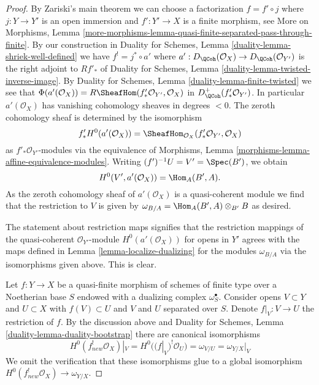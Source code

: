 \begin{proof}
By Zariski's main theorem we can choose a factorization $f = f' \circ j$
where $j : Y \to Y'$ is an open immersion and $f' : Y' \to X$ is a finite
morphism, see More on Morphisms, Lemma
\ref{more-morphisms-lemma-quasi-finite-separated-pass-through-finite}.
By our construction in
Duality for Schemes, Lemma \ref{duality-lemma-shriek-well-defined} we have
$f^! = j^* \circ a'$ where
$a' : D_\QCoh(\mathcal{O}_X) \to D_\QCoh(\mathcal{O}_{Y'})$
is the right adjoint to $Rf'_*$ of
Duality for Schemes, Lemma \ref{duality-lemma-twisted-inverse-image}.
By Duality for Schemes, Lemma \ref{duality-lemma-finite-twisted}
we see that
$\Phi(a'(\mathcal{O}_X)) = R\SheafHom(f'_*\mathcal{O}_{Y'}, \mathcal{O}_X)$ in
$D_\QCoh^+(f'_*\mathcal{O}_{Y'})$. In particular $a'(\mathcal{O}_X)$ has
vanishing cohomology sheaves in degrees $< 0$. The zeroth cohomology sheaf
is determined by the isomorphism
$$
f'_*H^0(a'(\mathcal{O}_X)) =
\SheafHom_{\mathcal{O}_X}(f'_*\mathcal{O}_{Y'}, \mathcal{O}_X)
$$
as $f'_*\mathcal{O}_{Y'}$-modules via the equivalence of
Morphisms, Lemma \ref{morphisms-lemma-affine-equivalence-modules}.
Writing $(f')^{-1}U = V' = \Spec(B')$, we obtain
$$
H^0(V', a'(\mathcal{O}_X)) = \Hom_A(B', A).
$$
As the zeroth cohomology sheaf of $a'(\mathcal{O}_X)$
is a quasi-coherent module we find that
the restriction to $V$ is given by
$\omega_{B/A} = \Hom_A(B', A) \otimes_{B'} B$ as desired.

\medskip\noindent
The statement about restriction maps signifies that the restriction mappings
of the quasi-coherent $\mathcal{O}_{Y'}$-module $H^0(a'(\mathcal{O}_X))$
for opens in $Y'$ agrees with the maps defined in
Lemma \ref{lemma-localize-dualizing}
for the modules $\omega_{B/A}$ via the isomorphisms given above.
This is clear.

\medskip\noindent
Let $f : Y \to X$ be a quasi-finite morphism of schemes of finite type
over a Noetherian base $S$ endowed with a dualizing complex $\omega_S^\bullet$.
Consider opens $V \subset Y$ and $U \subset X$ with $f(V) \subset U$
and $V$ and $U$ separated over $S$. Denote $f|_V : V \to U$ the restriction
of $f$. By the discussion above and
Duality for Schemes, Lemma \ref{duality-lemma-duality-bootstrap}
there are canonical isomorphisms
$$
H^0(f_{new}^!\mathcal{O}_X)|_V = H^0((f|_V)^!\mathcal{O}_U) = \omega_{V/U} =
\omega_{Y/X}|_V
$$
We omit the verification that these isomorphisms glue to a global
isomorphism $H^0(f_{new}^!\mathcal{O}_X) \to \omega_{Y/X}$.
\end{proof}

